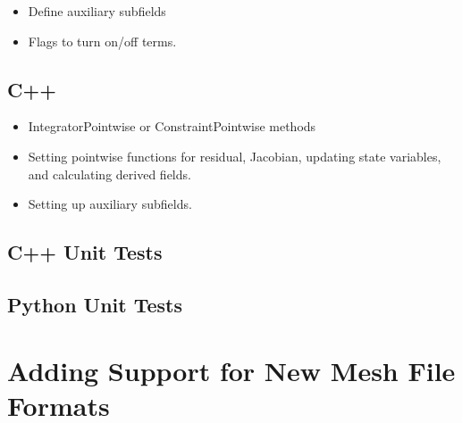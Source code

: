 \begin{itemize}
\item Define auxiliary subfields
\item Flags to turn on/off terms.
\end{itemize}

\subsection{C++}

\begin{itemize}
\item IntegratorPointwise or ConstraintPointwise methods
\item Setting pointwise functions for residual, Jacobian, updating
  state variables, and calculating derived fields.
\item Setting up auxiliary subfields.
\end{itemize}

\subsection{C++ Unit Tests}

\subsection{Python Unit Tests}


\section{Adding Support for New Mesh File Formats}

